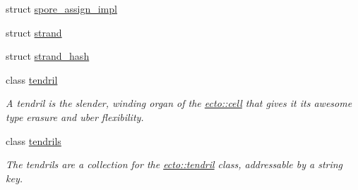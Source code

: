 \begin{DoxyCompactItemize}
struct \hyperlink{structecto_1_1spore__assign__impl}{spore\+\_\+assign\+\_\+impl}
\item 
struct \hyperlink{structecto_1_1strand}{strand}
\item 
struct \hyperlink{structecto_1_1strand__hash}{strand\+\_\+hash}
\item 
class \hyperlink{classecto_1_1tendril}{tendril}
\begin{DoxyCompactList}\small\item\em A tendril is the slender, winding organ of the \hyperlink{structecto_1_1cell}{ecto\+::cell} that gives it its awesome type erasure and uber flexibility. \end{DoxyCompactList}\item 
class \hyperlink{classecto_1_1tendrils}{tendrils}
\begin{DoxyCompactList}\small\item\em The tendrils are a collection for the \hyperlink{classecto_1_1tendril}{ecto\+::tendril} class, addressable by a string key. \end{DoxyCompactList}\end{DoxyCompactItemize}
